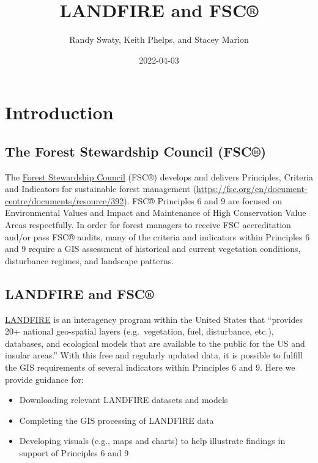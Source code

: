 \documentclass[
]{book}
\title{LANDFIRE and FSC®}
\author{Randy Swaty, Keith Phelps, and Stacey Marion}
\date{2022-04-03}
\providecommand{\tightlist}{%
  \setlength{\itemsep}{0pt}\setlength{\parskip}{0pt}}
\begin{document}
\maketitle

{
\setcounter{tocdepth}{1}
\tableofcontents
}
\hypertarget{Introduction}{%
\chapter{Introduction}\label{Introduction}}

\hypertarget{the-forest-stewardship-council-fsc}{%
\section{The Forest Stewardship Council (FSC®)}\label{the-forest-stewardship-council-fsc}}

The \href{https://fsc.org/en}{Forest Stewardship Council} (FSC®) develops and delivers Principles, Criteria and Indicators for sustainable forest management (\url{https://fsc.org/en/document-centre/documents/resource/392}). FSC® Principles 6 and 9 are focused on Environmental Values and Impact and Maintenance of High Conservation Value Areas respectfully. In order for forest managers to receive FSC accreditation and/or pass FSC® audits, many of the criteria and indicators within Principles 6 and 9 require a GIS assessment of historical and current vegetation conditions, disturbance regimes, and landscape patterns.

\hypertarget{landfire-and-fsc}{%
\section{LANDFIRE and FSC®}\label{landfire-and-fsc}}

\href{https://landfire.gov/}{LANDFIRE} is an interagency program within the United States that ``provides 20+ national geo-spatial layers (e.g.~vegetation, fuel, disturbance, etc.), databases, and ecological models that are available to the public for the US and insular areas.'' With this free and regularly updated data, it is possible to fulfill the GIS requirements of several indicators within Principles 6 and 9. Here we provide guidance for:

\begin{itemize}
\tightlist
\item
  Downloading relevant LANDFIRE datasets and models
\item
  Completing the GIS processing of LANDFIRE data
\item
  Developing visuals (e.g., maps and charts) to help illustrate findings in support of Principles 6 and 9
\end{itemize}
\end{document}
